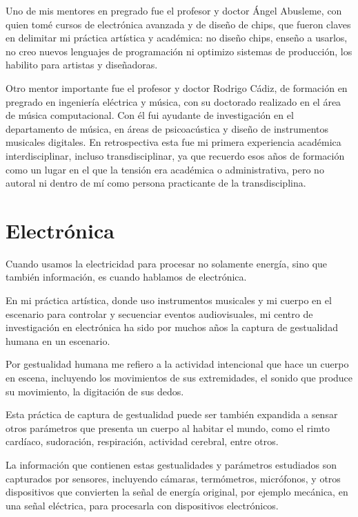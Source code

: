 \documentclass{article}
\begin{document}
Uno de mis mentores en pregrado fue el profesor y doctor Ángel Abusleme, con quien tomé cursos de electrónica avanzada y de diseño de chips, que fueron claves en delimitar mi práctica artística y académica: no diseño chips, enseño a usarlos, no creo nuevos lenguajes de programación ni optimizo sistemas de producción, los habilito para artistas y diseñadoras.

Otro mentor importante fue el profesor y doctor Rodrigo Cádiz, de formación en pregrado en ingeniería eléctrica y música, con su doctorado realizado en el área de música computacional. Con él fui ayudante de investigación en el departamento de música, en áreas de psicoacústica y diseño de instrumentos musicales digitales. En retrospectiva esta fue mi primera experiencia académica interdisciplinar, incluso transdisciplinar, ya que recuerdo esos años de formación como un lugar en el que la tensión era académica o administrativa, pero no autoral ni dentro de mí como persona practicante de la transdisciplina.

\clearpage

\section{Electrónica}

Cuando usamos la electricidad para procesar no solamente energía, sino que también información, es cuando hablamos de electrónica.

En mi práctica artística, donde uso instrumentos musicales y mi cuerpo en el escenario para controlar y secuenciar eventos audiovisuales, mi centro de investigación en electrónica ha sido por muchos años la captura de gestualidad humana en un escenario.

Por gestualidad humana me refiero a la actividad intencional que hace un cuerpo en escena, incluyendo los movimientos de sus extremidades, el sonido que produce su movimiento, la digitación de sus dedos.

Esta práctica de captura de gestualidad puede ser también expandida a sensar otros parámetros que presenta un cuerpo al habitar el mundo, como el rimto cardíaco, sudoración, respiración, actividad cerebral, entre otros.

La información que contienen estas gestualidades y parámetros estudiados son capturados por sensores, incluyendo cámaras, termómetros, micrófonos, y otros dispositivos que convierten la señal de energía original, por ejemplo mecánica, en una señal eléctrica, para procesarla con dispositivos electrónicos.
\end{document}
